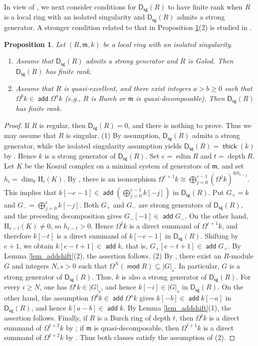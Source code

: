 \documentclass[10pt]{amsart}
\newtheorem{prop}[thm]{Proposition}
\theoremstyle{definition}
\theoremstyle{remark}
\numberwithin{equation}{thm}
\def\add{\operatorname{\mathsf{add}}}
\def\depth{\operatorname{depth}}
\def\dim{\operatorname{dim}}
\def\ds{\operatorname{\mathsf{D_{sg}}}}
\def\edim{\operatorname{edim}}
\def\ge{\geqslant}
\def\H{\mathrm{H}}
\def\m{\mathfrak{m}}
\def\mod{\operatorname{\mathsf{mod}}}
\def\syz{\Omega}
\def\thick{\operatorname{\mathsf{thick}}}
\begin{document}
In view of \cite[Theorem 4.16]{DLMO}, we next consider conditions for $\ds(R)$ to have finite rank when $R$ is a local ring with an isolated singularity and $\ds(R)$ admits a strong generator. 
A stronger condition related to that in Proposition \ref{prop_isolsing}(2) is studied in \cite[Section 2]{CK}.
\begin{prop}\label{prop_isolsing}
Let $(R,\m,k)$ be a local ring with an isolated singularity.
\begin{enumerate}[\rm(1)]
\item
Assume that $\ds(R)$ admits a strong generator and $R$ is Golod. 
Then $\ds(R)$ has finite rank.
\item
Assume that $R$ is quasi-excellent, and there exist integers $a>b\ge0$ such that ${\syz}^{b}k\in\add{\syz}^{a}k$ (e.g., $R$ is Burch or $\m$ is quasi-decomposable). 
Then $\ds(R)$ has finite rank.
\end{enumerate}
\end{prop}
\begin{proof}
If $R$ is regular, then $\ds(R)=0$, and there is nothing to prove. 
Thus we may assume that $R$ is singular.
(1) By assumption, $\ds(R)$ admits a strong generator, while the isolated singularity assumption yields $\ds(R)=\thick(k)$ by \cite[Corollary 4.5]{T2014}. 
Hence $k$ is a strong generator of $\ds(R)$.
Set $e=\edim R$ and $t=\depth R$. 
Let $K$ be the Koszul complex on a minimal system of generators of $\m$, and set $h_{i}=\dim_{k}\H_{i}(K)$. 
By \cite[Theorem 1.1]{CDEKPU}, there is an isomorphism ${\syz}^{e+1}k\cong\bigoplus_{j=0}^{e-1}({\syz}^{j}k)^{\oplus h_{e-j}}$.
This implies that $k[-e-1]\in\add(\bigoplus_{j=0}^{e-1}k[-j])$ in $\ds(R)$. 
Put $G_{+}=k$ and $G_{-}=\bigoplus_{j=0}^{e}k[-j]$. 
Both $G_{+}$ and $G_{-}$ are strong generators of $\ds(R)$, and the preceding decomposition gives $G_{-}[-1]\in\add G_{-}$. 
On the other hand, $\H_{e-t}(K)\ne0$, so $h_{e-t}>0$. Hence ${\syz}^{t}k$ is a direct summand of ${\syz}^{e+1}k$, and therefore $k[-t]$ is a direct summand of $k[-e-1]$ in $\ds(R)$. 
Shifting by $e+1$, we obtain $k[e-t+1]\in\add k$, that is, $G_{+}[e-t+1]\in\add G_{+}$. 
By Lemma \ref{lem_addshift}(2), the assertion follows.
(2) By \cite[Corollary 3.12]{DLT}, there exist an $R$-module $G$ and integers $N,s>0$ such that ${\syz}^{N}(\mod R)\subseteq{|G|}_{s}$. 
In particular, $G$ is a strong generator of $\ds(R)$. 
Thus, $k$ is also a strong generator of $\ds(R)$. 
For every $i\ge N$, one has ${\syz}^{i}k \in{|G|}_{s}$, and hence $k[-i]\in{|G|}_{s}$ in $\ds(R)$. 
On the other hand, the assumption ${\syz}^{b}k\in\add{\syz}^{a}k$ gives $k[-b]\in\add k[-a]$ in $\ds(R)$, and hence $k[a-b]\in\add k$. 
By Lemma \ref{lem_addshift}(1), the assertion follows.
Finally, if $R$ is a Burch ring of depth $t$, then ${\syz}^{t}k$ is a direct summand of ${\syz}^{t+2}k$ by \cite[Proposition 5.10]{DKT}; if $\m$ is quasi-decomposable, then ${\syz}^{t+1}k$ is a direct summand of ${\syz}^{t+2}k$ by \cite[Proposition 4.3(3)]{T2026}.
Thus both classes satisfy the assumption of (2).
\end{proof}
\end{document}
